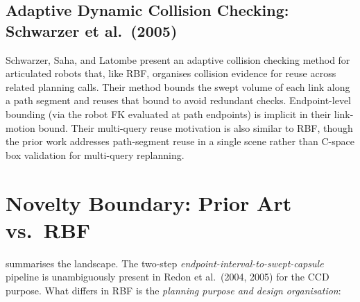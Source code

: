 \documentclass[11pt,a4paper]{article}
\begin{document}
\subsection{Adaptive Dynamic Collision Checking: Schwarzer et al.\ (2005)}

Schwarzer, Saha, and Latombe \cite{schwarzer2005adaptive} present an adaptive
collision checking method for articulated robots that, like RBF, organises
collision evidence for reuse across related planning calls.  Their method bounds
the swept volume of each link along a path segment and reuses that bound to
avoid redundant checks.  Endpoint-level bounding (via the robot FK evaluated at
path endpoints) is implicit in their link-motion bound.  Their multi-query reuse
motivation is also similar to RBF, though the prior work addresses path-segment
reuse in a single scene rather than C-space box validation for multi-query
replanning.

\section{Novelty Boundary: Prior Art vs.\ RBF}
\label{sec:novelty_boundary}

 summarises the landscape.  The two-step
\emph{endpoint-interval-to-swept-capsule} pipeline is unambiguously present in
Redon et al.\ (2004, 2005) for the CCD purpose.  What differs in RBF is the
\emph{planning purpose and design organisation}:
\end{document}
